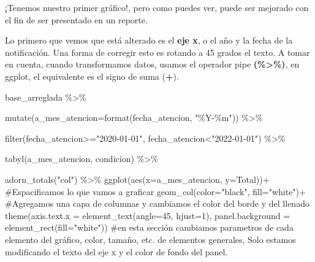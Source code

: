 \documentclass[
  letterpaper,
  DIV=11,
  numbers=noendperiod]{scrreprt}
\newenvironment{Shaded}{\begin{snugshade}}{\end{snugshade}}
\newcommand{\AttributeTok}[1]{\textcolor[rgb]{0.40,0.45,0.13}{#1}}
\newcommand{\CommentTok}[1]{\textcolor[rgb]{0.37,0.37,0.37}{#1}}
\newcommand{\DecValTok}[1]{\textcolor[rgb]{0.68,0.00,0.00}{#1}}
\newcommand{\FunctionTok}[1]{\textcolor[rgb]{0.28,0.35,0.67}{#1}}
\newcommand{\NormalTok}[1]{\textcolor[rgb]{0.00,0.23,0.31}{#1}}
\newcommand{\SpecialCharTok}[1]{\textcolor[rgb]{0.37,0.37,0.37}{#1}}
\newcommand{\StringTok}[1]{\textcolor[rgb]{0.13,0.47,0.30}{#1}}
\begin{document}
¡Tenemos nuestro primer gráfico!, pero como puedes ver, puede ser
mejorado con el fin de ser presentado en un reporte.

Lo primero que vemos que está alterado es el \textbf{eje x}, o el año y
la fecha de la notificación. Una forma de corregir esto es rotando a 45
grados el texto. A tomar en cuenta, cuando transformamos datos, usamos
el operador pipe \textbf{(\%\textgreater\%)}, en ggplot, el equivalente
es el signo de suma (\textbf{+}).

\begin{Shaded}
\begin{Highlighting}[]
\NormalTok{base\_arreglada }\SpecialCharTok{\%\textgreater{}\%}
  
  \FunctionTok{mutate}\NormalTok{(}\AttributeTok{a\_mes\_atencion=}\FunctionTok{format}\NormalTok{(fecha\_atencion, }\StringTok{"\%Y{-}\%m"}\NormalTok{)) }\SpecialCharTok{\%\textgreater{}\%} 
 
   \FunctionTok{filter}\NormalTok{(fecha\_atencion}\SpecialCharTok{\textgreater{}=}\StringTok{"2020{-}01{-}01"}\NormalTok{, fecha\_atencion}\SpecialCharTok{\textless{}}\StringTok{"2022{-}01{-}01"}\NormalTok{) }\SpecialCharTok{\%\textgreater{}\%} 
  
  \FunctionTok{tabyl}\NormalTok{(a\_mes\_atencion, condicion) }\SpecialCharTok{\%\textgreater{}\%} 
  
  \FunctionTok{adorn\_totals}\NormalTok{(}\StringTok{"col"}\NormalTok{) }\SpecialCharTok{\%\textgreater{}\%}
\FunctionTok{ggplot}\NormalTok{(}\FunctionTok{aes}\NormalTok{(}\AttributeTok{x=}\NormalTok{a\_mes\_atencion, }\AttributeTok{y=}\NormalTok{Total))}\SpecialCharTok{+} \CommentTok{\#Espacificamos lo que vamos a graficar}
  \FunctionTok{geom\_col}\NormalTok{(}\AttributeTok{color=}\StringTok{"black"}\NormalTok{, }\AttributeTok{fill=}\StringTok{"white"}\NormalTok{)}\SpecialCharTok{+} \CommentTok{\#Agregamos una capa de columnas y cambiamos el color del borde y del llenado}
  \FunctionTok{theme}\NormalTok{(}\AttributeTok{axis.text.x =} \FunctionTok{element\_text}\NormalTok{(}\AttributeTok{angle=}\DecValTok{45}\NormalTok{, }\AttributeTok{hjust=}\DecValTok{1}\NormalTok{),}
        \AttributeTok{panel.background =} \FunctionTok{element\_rect}\NormalTok{(}\AttributeTok{fill=}\StringTok{"white"}\NormalTok{)) }\CommentTok{\#en esta sección cambiamos parametros de cada elemento del gráfico, color, tamaño, etc. de elementos generales, Solo estamos modificando el texto del eje x y el color de fondo del panel.}
\end{Highlighting}
\end{Shaded}
\end{document}
